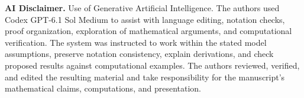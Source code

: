 \textbf{AI Disclaimer.} Use of Generative Artificial Intelligence. The authors used Codex GPT-6.1 Sol Medium to assist with language editing, notation checks, proof organization, exploration of mathematical arguments, and computational verification. The system was instructed to work within the stated model assumptions, preserve notation consistency, explain derivations, and check proposed results against computational examples. The authors reviewed, verified, and edited the resulting material and take responsibility for the manuscript’s mathematical claims, computations, and presentation.
